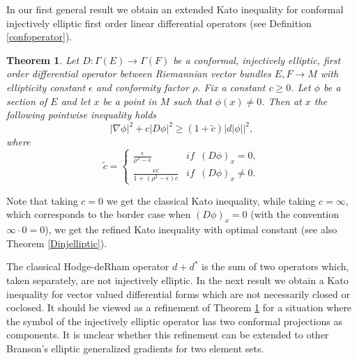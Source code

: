 \documentclass[12pt]{amsart} %
\newtheorem{theorem}{Theorem}[section]
\theoremstyle{definition}
\numberwithin{equation}{section}
\newcommand{\ra}{\rightarrow}
\begin{document}
In our first general result we obtain an extended Kato inequality for conformal injectively elliptic first order linear differential operators (see Definition \ref{confoperator}).

\begin{theorem}
\label{thm:foldo} Let $D :\Gamma(E)\ra \Gamma(F)$ be a conformal, injectively elliptic, first order differential operator between Riemannian vector bundles $E,F \ra M$ with ellipticity constant $\epsilon$ and conformity factor $\rho$. Fix a constant $c\geq 0$. Let $\phi$
be a section of $E$ and let $x$ be a point in $M$ such that $\phi(x)\neq0$.
Then at $x$ the following pointwise inequality holds
\[
|\nabla\phi|^{2}+c|D\phi|^{2}\geq\left(1+\tilde{c}\right)|d|\phi||^{2},
\]
where
\[
\tilde{c}=\begin{cases}
\frac{\epsilon}{\rho^2-\epsilon} & if\,\,\,\left(D\phi\right)_{x}=0,\\
\frac{\epsilon c}{1+\left(\rho^2-\epsilon\right)c} & if\,\,\,\left(D\phi\right)_{x}\neq0.
\end{cases}
\]
\end{theorem}

Note that taking $c=0$ we get the classical Kato inequality, while taking $c=\infty$, which corresponds to the border case when $(D\phi)_x=0$ (with the convention $\infty\cdot 0=0$), we get the refined Kato inequality with optimal constant (see also Theorem \ref{Dinjelliptic}).

The classical Hodge-deRham operator $d+d^ *$ is the sum of two operators which, taken separately, are not injectively elliptic.  In the next result we obtain a Kato inequality for vector valued differential forms which are not necessarily closed or coclosed. It should be viewed as a refinement of Theorem \ref{thm:foldo} for a situation where the symbol of the injectively elliptic operator has two conformal projections as components. It is unclear whether this refinement can be extended to other Branson's  elliptic generalized gradients \cite{Br1} for two element sets.
\end{document}

